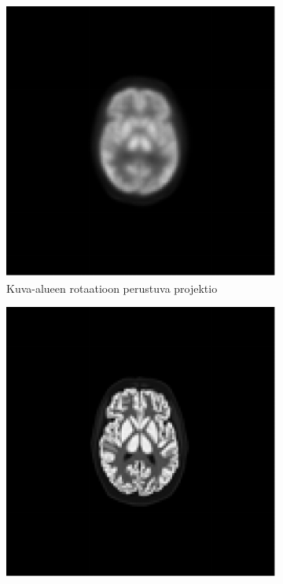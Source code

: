 \begin{figure}[H]
    \centering
    \captionsetup{width=.9\linewidth}
    \begin{subfigure}[t]{.25\textwidth}
        \includegraphics[width=\linewidth]{kuvat/cbf_rekonstruktio_proj6.pdf}
        \caption{Kuva-alueen rotaatioon perustuva projektio}
    \end{subfigure}%
    \hspace{.075\textwidth}%
    \begin{subfigure}[t]{.25\textwidth}
        \includegraphics[width=\linewidth]{kuvat/cbf_ground_truth.pdf}

\end{subfigure}
\end{figure}
